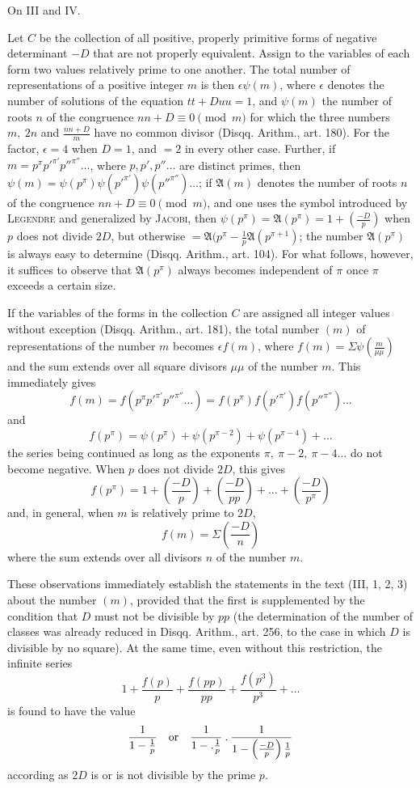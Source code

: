 \par\medskip{}\centerline{On III and IV.}\smallskip
Let $C$ be the collection of all positive, properly primitive forms of negative determinant $-D$ that are not properly equivalent. Assign to the variables of each form two values relatively prime to one another. The total number of representations of a positive integer $m$ is then $\epsilon\psi(m)$, where $\epsilon$ denotes the number of solutions of the equation $tt+Duu=1$, and $\psi(m)$ the number of roots $n$ of the congruence $nn+D\equiv0\pmod m$ for which the three numbers $m,\ 2n$ and $\frac{nn+D}m$ have no common divisor (Disqq. Arithm., art. 180). For the factor, $\epsilon$$=4$ when $D=1$, and $=2$ in every other case. Further, if $m=p^\pi p'^{\pi'}p''^{\pi''}\ldots$, where $p,p',p''\ldots$ are distinct primes, then $\psi(m)=\psi(p^\pi)\psi(p'^{\pi'})\psi(p''^{\pi''})\ldots$; if $\mathfrak A(m)$ denotes the number of roots $n$ of the congruence $nn+D\equiv0\pmod m$, and one uses the symbol introduced by \textsc{Legendre} and generalized by \textsc{Jacobi}, then $\psi(p^\pi)=\mathfrak A(p^\pi)=1+\left(\frac{-D}p\right)$ when $p$ does not divide $2D$, but otherwise $=\mathfrak A(p^\pi-\frac1p\mathfrak A(p^{\pi+1})$; the number $\mathfrak A(p^\pi)$ is always easy to determine (Disqq. Arithm., art. 104). For what follows, however, it suffices to observe that $\mathfrak A(p^\pi)$ always becomes independent of $\pi$ once $\pi$ exceeds a certain size.

If the variables of the forms in the collection $C$ are assigned all integer values without exception (Disqq. Arithm., art. 181), the total number $(m)$ of representations of the number $m$ becomes $\epsilon f(m)$, where $f(m)=\Sigma\psi\left(\frac m{\mu\mu}\right)$ and the sum extends over all square divisors $\mu\mu$ of the number $m$. This immediately gives
\[
f(m)=f(p^\pi p'^{\pi'}p''^{\pi''}\ldots)=f(p^\pi)f(p'^{\pi'})f(p''^{\pi''})\ldots
\]
and
\[
f(p^\pi)=\psi(p^\pi)+\psi(p^{\pi-2})+\psi(p^{\pi-4})+\ldots
\]
the series being continued as long as the exponents $\pi,\ \pi-2,\ \pi-4\ldots$ do not become negative. When $p$ does not divide $2D$, this gives
\[
f(p^\pi)=1+\left(\frac{-D}p\right)+\left(\frac{-D}{pp}\right)+\ldots+\left(\frac{-D}{p^\pi}\right)
\]
and, in general, when $m$ is relatively prime to $2D$,
\[
f(m)=\Sigma\left(\frac{-D}n\right)
\]
where the sum extends over all divisors $n$ of the number $m$.

These observations immediately establish the statements in the text (III, 1, 2, 3) about the number $(m)$, provided that the first is supplemented by the condition that $D$ must not be divisible by $pp$ (the determination of the number of classes was already reduced in Disqq. Arithm., art. 256, to the case in which $D$ is divisible by no square). At the same time, even without this restriction, the infinite series
\[
1+\frac{f(p)}p+\frac{f(pp)}{pp}+\frac{f(p^3)}{p^3}+\ldots
\]
is found to have the value
\[
\frac1{1-\frac1p}\quad\text{or}\quad\frac1{1-.\frac1p}\mathbin{.}\frac1{1-\left(\frac{-D}p\right)\frac1p}
\]
according as $2D$ is or is not divisible by the prime $p$.
